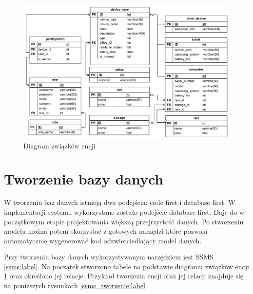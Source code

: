 \begin{figure}[h]
    \includegraphics[width=\linewidth]{rys04/ER_Diagram.pdf}
    \caption{Diagram związków encji}
    \label{ErDiagram:label}
\end{figure}

\section{Tworzenie bazy danych}
W tworzeniu baz danych istnieją dwa podejścia: code first i database first. W implementacji systemu wykorzystane zostało podejście database first. Daje do w początkowym etapie projektowania większą przejrzystość danych. Po stworzeniu modelu można potem skorzystać z gotowych narzędzi które pozwolą automatycznie wygenerować kod odzwierciedlający model danych.

Przy tworzeniu bazy danych wykorzystywanym narzędziem jest SSMS \ref{ssms:label}. 
Na początek stworzono tabele na podstawie diagramu związków encji \ref{ErDiagram:label} oraz określono jej relacje. Przykład tworzenia encji oraz jej relacji znajduje się na poniższych rysunkach \ref{ssms_tworzenie:label}

